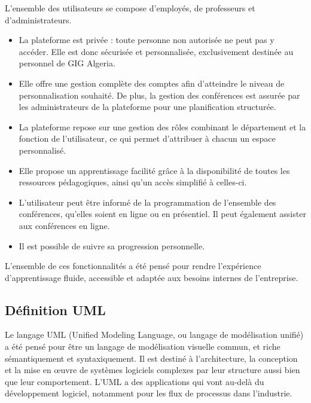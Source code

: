 \documentclass{article}
\begin{document}
\vspace{0,2cm}
L'ensemble des utilisateurs se compose d'employés, de professeurs et d'administrateurs.
\begin{itemize}
    \item La plateforme est privée : toute personne non autorisée ne peut pas y accéder. Elle est donc sécurisée et personnalisée, exclusivement destinée au personnel de GIG Algeria.


    \item Elle offre une gestion complète des comptes afin d’atteindre le niveau de personnalisation souhaité. De plus, la gestion des conférences est assurée par les administrateurs de la plateforme pour une planification structurée.
    

 \item La plateforme repose sur une gestion des rôles combinant le département et la fonction de l’utilisateur, ce qui permet d’attribuer à chacun un espace personnalisé.
\item Elle propose un apprentissage facilité grâce à la disponibilité de toutes les ressources pédagogiques, ainsi qu’un accès simplifié à celles-ci. 
\item L’utilisateur peut être informé de la programmation de l’ensemble des conférences, qu’elles soient en ligne ou en présentiel. Il peut également assister aux conférences en ligne.





    
    \item Il est possible de suivre sa progression personnelle.
   
\end{itemize}

\noindent L’ensemble de ces fonctionnalités a été pensé pour rendre l’expérience d’apprentissage fluide, accessible et adaptée aux besoins internes de l’entreprise.
\subsection{Définition UML} 
\hspace*{2em}Le langage UML (Unified Modeling Language, ou langage de modélisation unifié) a été pensé pour être un langage de modélisation visuelle commun, et riche sémantiquement et syntaxiquement. Il est destiné à l'architecture, la conception et la mise en œuvre de systèmes logiciels complexes par leur structure aussi bien que leur comportement. L'UML a des applications qui vont au-delà du développement logiciel, notamment pour les flux de processus dans l'industrie.\cite{UML}
\end{document}
